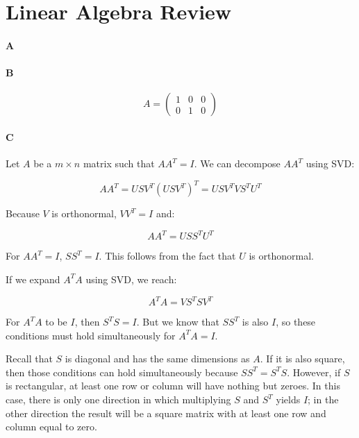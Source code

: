 \documentclass[12pt]{article}
\begin{document}
\maketitle

\section{Linear Algebra Review}

\paragraph{A}

\paragraph{B}
\begin{equation}
A = \left( \begin{array}{ccc} 1 & 0 & 0 \\ 0 & 1 & 0 \end{array} \right)
\end{equation}

\paragraph{C}
Let $A$ be a $m \times n$ matrix such that $AA^T=I$. We can decompose $AA^T$ using SVD:

\[
AA^T = USV^T\left(USV^T\right)^T = USV^TVS^TU^T\]

Because $V$ is orthonormal, $VV^T=I$ and:

\[
AA^T = USS^TU^T
\]

For $AA^T=I$, $SS^T=I$. This follows from the fact that $U$ is orthonormal.

If we expand $A^TA$ using SVD, we reach:

\[
A^TA = VS^TSV^T
\]

For $A^TA$ to be $I$, then $S^TS=I$. But we know that $SS^T$ is also $I$, so these conditions must hold simultaneously for $A^TA=I$.

Recall that $S$ is diagonal and has the same dimensions as $A$. If it is also square, then those conditions can hold simultaneously because $SS^T=S^TS$. However, if $S$ is rectangular, at least one row or column will have nothing but zeroes. In this case, there is only one direction in which multiplying $S$ and $S^T$ yields $I$; in the other direction the result will be a square matrix with at least one row and column equal to zero.
\end{document}
